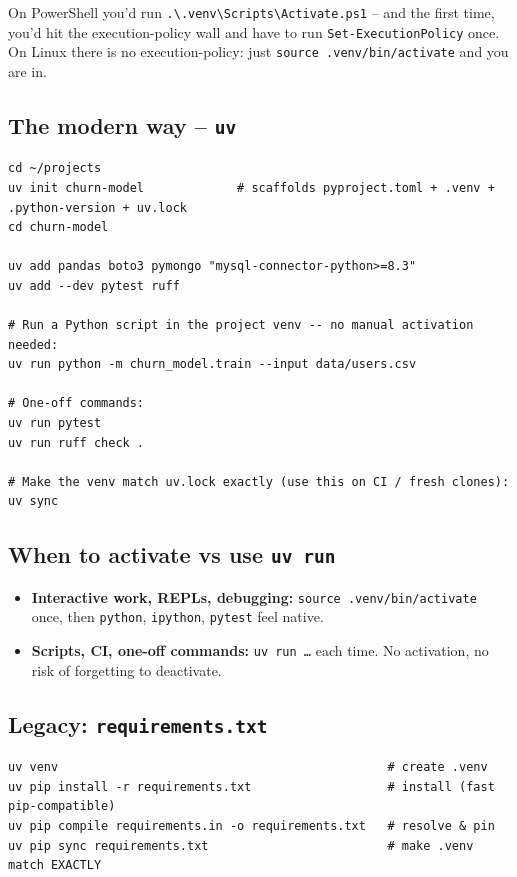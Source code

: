 \documentclass[11pt,a4paper]{article}
\newcommand{\pscmd}[1]{\texttt{\textcolor{pwshKw}{#1}}}
\begin{document}
\begin{compareps}
On PowerShell you'd run \pscmd{.\textbackslash{}.venv\textbackslash{}Scripts\textbackslash{}Activate.ps1}
-- and the first time, you'd hit the execution-policy wall and
have to run \pscmd{Set-ExecutionPolicy} once. On Linux there is no
execution-policy: just \texttt{source .venv/bin/activate} and you
are in.
\end{compareps}

\subsection*{The modern way -- \texttt{uv}}

\begin{lstlisting}[style=bashstyle]
cd ~/projects
uv init churn-model             # scaffolds pyproject.toml + .venv + .python-version + uv.lock
cd churn-model

uv add pandas boto3 pymongo "mysql-connector-python>=8.3"
uv add --dev pytest ruff

# Run a Python script in the project venv -- no manual activation needed:
uv run python -m churn_model.train --input data/users.csv

# One-off commands:
uv run pytest
uv run ruff check .

# Make the venv match uv.lock exactly (use this on CI / fresh clones):
uv sync
\end{lstlisting}

\subsection*{When to activate vs use \texttt{uv run}}

\begin{itemize}[leftmargin=*]
\item \textbf{Interactive work, REPLs, debugging:} \texttt{source
.venv/bin/activate} once, then \texttt{python}, \texttt{ipython},
\texttt{pytest} feel native.
\item \textbf{Scripts, CI, one-off commands:} \texttt{uv run \dots}
each time. No activation, no risk of forgetting to deactivate.
\end{itemize}

\subsection*{Legacy: \texttt{requirements.txt}}

\begin{lstlisting}[style=bashstyle]
uv venv                                              # create .venv
uv pip install -r requirements.txt                   # install (fast pip-compatible)
uv pip compile requirements.in -o requirements.txt   # resolve & pin
uv pip sync requirements.txt                         # make .venv match EXACTLY
\end{lstlisting}
\end{document}
